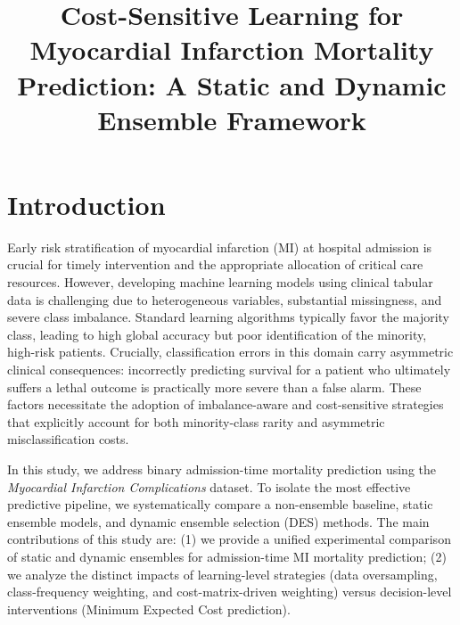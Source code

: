 \documentclass[conference]{IEEEtran}
\title{Cost-Sensitive Learning for Myocardial Infarction Mortality Prediction: A Static and Dynamic Ensemble Framework}
\author{
\IEEEauthorblockN{Leonardo Saccotelli}
\IEEEauthorblockA{
Università degli Studi di Bari Aldo Moro \\
Email: l.saccotelli@studenti.uniba.it
}
}
\begin{document}
\maketitle
\IEEEdisplaynontitleabstractindextext

\section{Introduction} 
Early risk stratification of myocardial infarction (MI) at hospital admission is crucial for timely intervention and the appropriate allocation of critical care resources. However, developing machine learning models using clinical tabular data is challenging due to heterogeneous variables, substantial missingness, and severe class imbalance. Standard learning algorithms typically favor the majority class, leading to high global accuracy but poor identification of the minority, high-risk patients. Crucially, classification errors in this domain carry asymmetric clinical consequences: incorrectly predicting survival for a patient who ultimately suffers a lethal outcome is practically more severe than a false alarm. These factors necessitate the adoption of imbalance-aware and cost-sensitive strategies that explicitly account for both minority-class rarity and asymmetric misclassification costs.

In this study, we address binary admission-time mortality prediction using the \textit{Myocardial Infarction Complications} dataset. To isolate the most effective predictive pipeline, we systematically compare a non-ensemble baseline, static ensemble models, and dynamic ensemble selection (DES) methods. The main contributions of this study are: (1) we provide a unified experimental comparison of static and dynamic ensembles for admission-time MI mortality prediction; (2) we analyze the distinct impacts of learning-level strategies (data oversampling, class-frequency weighting, and cost-matrix-driven weighting) versus decision-level interventions (Minimum Expected Cost prediction).
\end{document}
